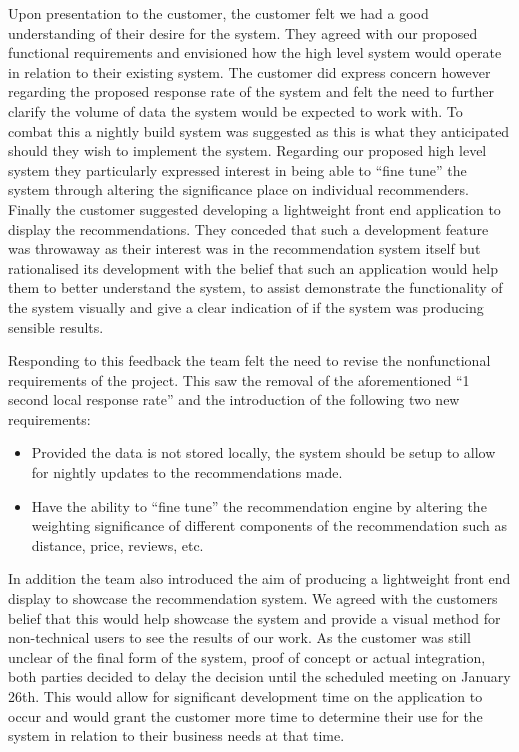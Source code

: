 \documentclass{l3proj}
\begin{document}
Upon presentation to the customer, the customer felt we had a good understanding of their desire for the system. They agreed with our proposed functional requirements and envisioned how the high level system would operate in relation to their existing system. The customer did express concern however regarding the proposed response rate of the system and felt the need to further clarify the volume of data the system would be expected to work with. To combat this a nightly build system was suggested as this is what they anticipated should they wish to implement the system. Regarding our proposed high level system they particularly expressed interest in being able to “fine tune” the system through altering the significance place on individual recommenders. Finally the customer suggested developing a lightweight front end application to display the recommendations. They conceded that such a development feature was throwaway as their interest was in the recommendation system itself but rationalised its development with the belief that such an application would help them to better understand the system, to assist demonstrate the functionality of the system visually and give a clear indication of if the system was producing sensible results. 

Responding to this feedback the team felt the need to revise the nonfunctional requirements of the project. This saw the removal of the aforementioned “1 second local response 
rate” and the introduction of the following two new requirements:

\begin{itemize}
\item Provided the data is not stored locally, the system should be setup to allow for nightly updates to the recommendations made.
\item Have the ability to “fine tune” the recommendation engine by altering the weighting significance of different components of the recommendation such as distance, price, 
reviews, etc.
\end{itemize}

In addition the team also introduced the aim of producing a lightweight front end display to showcase the recommendation system. We agreed with the customers belief that this would help showcase the system and provide a visual method for non-technical users to see the results of our work. As the customer was still unclear of the final form of the system, proof of concept or actual integration, both parties decided to delay the decision until the scheduled meeting on January 26th. This would allow for significant development time on the application to occur and would grant the customer more time to determine their use for the system in relation to their business needs at that time. 
\end{document}
